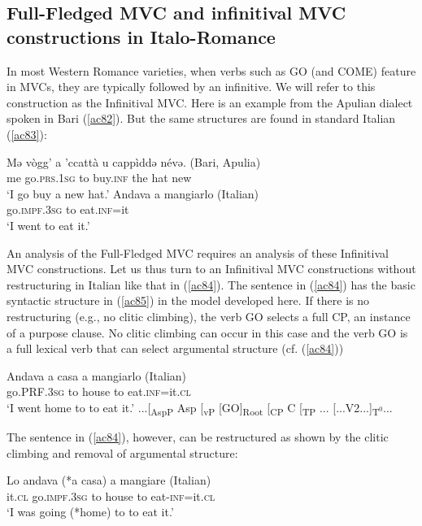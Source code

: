 \documentclass[output=paper]{langscibook}
\begin{document}
\subsection{Full-Fledged MVC and infinitival MVC constructions in Italo-Romance}

In most Western Romance varieties, when verbs such as GO (and COME) feature in MVCs, they are typically followed by an infinitive. We will refer to this construction as the Infinitival MVC. Here is an example from the Apulian dialect spoken in Bari (\ref{ac82}).  But the same structures are found in standard Italian (\ref{ac83}): 

\ea \label{ac82}\gll Mə  vògg’    a  ’ccattà  u  cappìddə  névə.   \hfill (Bari, Apulia)\\
   me  go.\textsc{prs}.\textsc{1sg} to  buy.\textsc{inf}  the  hat    new {}\\
   \glt ‘I go buy a new hat.’ \hfill \citep[231]{andriani2017a}
\ex \label{ac83}\gll Andava      a     mangiarlo      \hfill (Italian)\\
     go.\textsc{impf}.\textsc{3sg}   to    eat.\textsc{inf}=it {}\\
    \glt ‘I went to eat it.’ 
\z

An analysis of the Full-Fledged MVC requires an analysis of these Infinitival MVC constructions. Let us thus turn to an Infinitival MVC constructions without restructuring in Italian like that in (\ref{ac84}).  The sentence in (\ref{ac84}) has the basic syntactic structure in (\ref{ac85}) in the model developed here.  If there is no restructuring (e.g., no clitic climbing), the verb GO selects a full CP, an instance of a purpose clause. No clitic climbing can occur in this case and the verb GO is a full lexical verb that can select argumental structure (cf. (\ref{ac84}))

\ea \label{ac84}\gll Andava   a casa   a    mangiarlo       \hfill (Italian)\\
    go.PRF.\textsc{3sg} to house  to   eat.\textsc{inf}=it.\textsc{cl}\\
    \glt ‘I went home to to eat it.’
\ex \label{ac85}...[\textsubscript{AspP} Asp [\textsubscript{vP} [GO]\textsubscript{Root} [\textsubscript{CP} C [\textsubscript{TP} ... [...V2...]\textsubscript{T$^0$}...
\z

The sentence in (\ref{ac84}), however, can be restructured as shown by the clitic climbing and removal of argumental structure:

\ea \label{ac86}\gll Lo   andava    (*a casa) a mangiare  \hfill    (Italian)\\
    it.\textsc{cl} go.\textsc{impf}.\textsc{3sg}  to house to  eat-\textsc{inf}=it.\textsc{cl}\\
    \glt ‘I was going  (*home) to to eat it.’
\z
\end{document}
